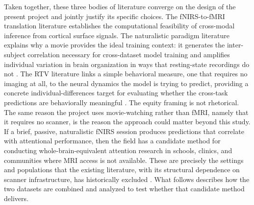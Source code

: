 Taken together, these three bodies of literature converge on the design of the present project and jointly justify its specific choices. The fNIRS-to-fMRI translation literature establishes the computational feasibility of cross-modal inference from cortical surface signals. The naturalistic paradigm literature explains why a movie provides the ideal training context: it generates the inter-subject correlation necessary for cross-dataset model training and amplifies individual variation in brain organization in ways that resting-state recordings do not \citep{finn2021, gao2025, hasson2010}. The RTV literature links a simple behavioral measure, one that requires no imaging at all, to the neural dynamics the model is trying to predict, providing a concrete individual-differences target for evaluating whether the cross-task predictions are behaviorally meaningful \citep{kofler2013}. The equity framing is not rhetorical. The same reason the project uses movie-watching rather than fMRI, namely that it requires no scanner, is the reason the approach could matter beyond this study. If a brief, passive, naturalistic fNIRS session produces predictions that correlate with attentional performance, then the field has a candidate method for conducting whole-brain-equivalent attention research in schools, clinics, and communities where MRI access is not available. These are precisely the settings and populations that the existing literature, with its structural dependence on scanner infrastructure, has historically excluded \citep{burns2019, farah2006, noble2015}. What follows describes how the two datasets are combined and analyzed to test whether that candidate method delivers.
